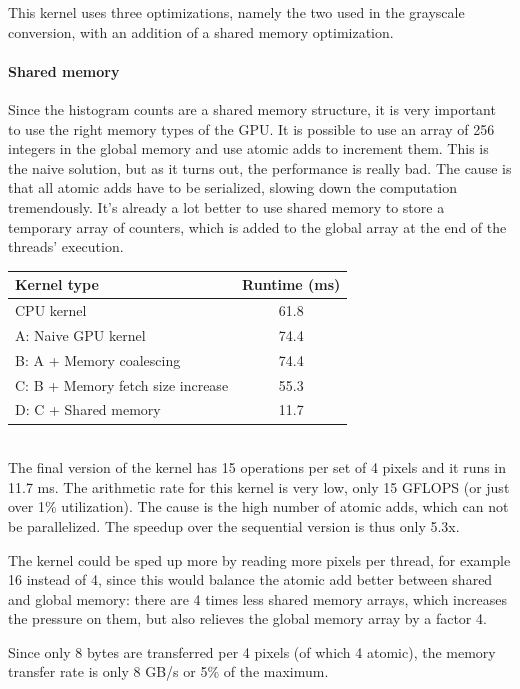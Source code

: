 \documentclass[11pt,a4paper]{article}
\begin{document}
This kernel uses three optimizations, namely the two used in the grayscale conversion, with an addition of a shared memory optimization.

\paragraph{Shared memory}
Since the histogram counts are a shared memory structure, it is very important to use the right memory types of the GPU. It is possible to use an array of 256 integers in the global memory and use atomic adds to increment them. This is the naive solution, but as it turns out, the performance is really bad. The cause is that all atomic adds have to be serialized, slowing down the computation tremendously.
It's already a lot better to use shared memory to store a temporary array of counters, which is added to the global array at the end of the threads' execution. \\

\begin{tabular}{ | l | S | }
	\hline
	\textbf{Kernel type} & \textbf{Runtime (ms)} \\
	\hline                       
	CPU kernel & 61.8 \\
	\hline
	A: Naive GPU kernel & 74.4 \\
	\hline
	B: A + Memory coalescing & 74.4 \\
	\hline
	C: B + Memory fetch size increase & 55.3 \\
	\hline
	D: C + Shared memory & 11.7 \\
	\hline
\end{tabular} \\

The final version of the kernel has 15 operations per set of 4 pixels and it runs in 11.7 ms. The arithmetic rate for this kernel is very low, only 15 GFLOPS (or just over 1\% utilization). The cause is the high number of atomic adds, which can not be parallelized. The speedup over the sequential version is thus only 5.3x.

The kernel could be sped up more by reading more pixels per thread, for example 16 instead of 4, since this would balance the atomic add better between shared and global memory: there are 4 times less shared memory arrays, which increases the pressure on them, but also relieves the global memory array by a factor 4.

Since only 8 bytes are transferred per 4 pixels (of which 4 atomic), the memory transfer rate is only 8 GB/s or 5\% of the maximum.
\end{document}
